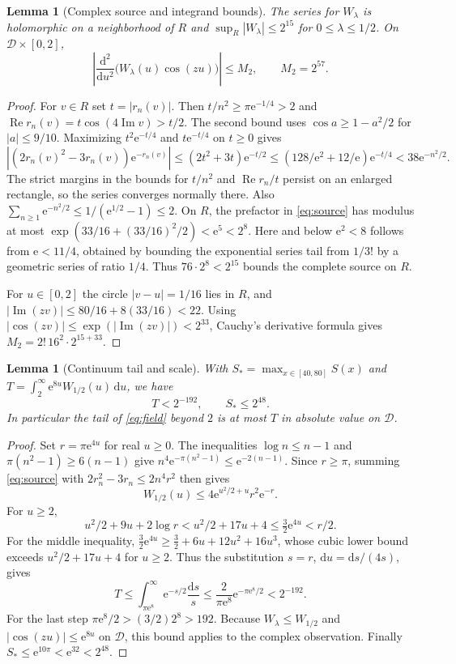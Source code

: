 \documentclass[11pt]{article}
\newtheorem{lemma}[theorem]{Lemma}
\newcommand{\e}{\mathrm e}
\newcommand{\dd}{\mathrm d}
\newcommand{\boxD}{\mathcal D}
\begin{document}
\begin{lemma}[Complex source and integrand bounds]
\label{lem:complex}
The series for \(W_\lambda\) is holomorphic on a neighborhood of \(R\)
and \(\sup_R |W_\lambda|\le 2^{15}\) for \(0\le\lambda\le1/2\). On
\(\boxD\times[0,2]\),
\[
 \left|\frac{\dd^2}{\dd u^2}\bigl(W_\lambda(u)\cos(zu)\bigr)\right|
 \le M_2,\qquad M_2=2^{57}.
\]
\end{lemma}
\begin{proof}
For \(v\in R\) set \(t=|r_n(v)|\). Then
\(t/n^2\ge\pi\e^{-1/4}>2\) and
\(\operatorname{Re}r_n(v)=t\cos(4\operatorname{Im}v)>t/2\).
The second bound uses \(\cos a\ge1-a^2/2\) for \(|a|\le9/10\).
Maximizing \(t^2\e^{-t/4}\) and \(t\e^{-t/4}\) on \(t\ge0\) gives
\[
 |(2r_n(v)^2-3r_n(v))\e^{-r_n(v)}|
 \le (2t^2+3t)\e^{-t/2}
 \le (128/\e^2+12/\e)\e^{-t/4}<38\e^{-n^2/2}.
\]
The strict margins in the bounds for \(t/n^2\) and
\(\operatorname{Re}r_n/t\) persist on an enlarged rectangle,
so the series converges normally there. Also
\(\sum_{n\ge1}\e^{-n^2/2}\le 1/(\e^{1/2}-1)\le2\).
On \(R\), the prefactor in \eqref{eq:source} has
modulus at most \(\exp(33/16+(33/16)^2/2)<\e^5<2^8\).
Here and below \(\e^2<8\) follows from \(\e<11/4\), obtained by
bounding the exponential series tail from \(1/3!\) by a geometric series
of ratio \(1/4\). Thus \(76\cdot2^8<2^{15}\) bounds the complete
source on \(R\).

For \(u\in[0,2]\) the circle \(|v-u|=1/16\) lies in \(R\), and
\(|\operatorname{Im}(zv)|\le80/16+8(33/16)<22\).
Using \(|\cos(zv)|\le \exp(|\operatorname{Im}(zv)|)<2^{33}\),
Cauchy's derivative formula gives \(M_2=2!\,16^2\cdot2^{15+33}\).
\end{proof}

\begin{lemma}[Continuum tail and scale]
\label{lem:tail}
With \(S_*=\max_{x\in[40,80]}S(x)\) and
\(T=\int_2^\infty \e^{8u}W_{1/2}(u)\,\dd u\), we have
\[
 T<2^{-192},\qquad S_*\le2^{48}.
\]
In particular the tail of \eqref{eq:field} beyond \(2\) is at most \(T\)
in absolute value on \(\boxD\).
\end{lemma}
\begin{proof}
Set \(r=\pi\e^{4u}\) for real \(u\ge0\). The inequalities
\(\log n\le n-1\) and \(\pi(n^2-1)\ge6(n-1)\) give
\(n^4\e^{-\pi(n^2-1)}\le \e^{-2(n-1)}\).
Since \(r\ge\pi\), summing \eqref{eq:source} with
\(2r_n^2-3r_n\le2n^4r^2\) then gives
\[
 W_{1/2}(u)\le4\e^{u^2/2+u}r^2\e^{-r}.
\]
For \(u\ge2\),
\[
 u^2/2+9u+2\log r
 <u^2/2+17u+4
 \le \tfrac32\e^{4u}<r/2.
\]
For the middle inequality,
\(\tfrac32\e^{4u}\ge\tfrac32+6u+12u^2+16u^3\), whose cubic
lower bound exceeds \(u^2/2+17u+4\) for \(u\ge2\).
Thus the substitution \(s=r\), \(\dd u=\dd s/(4s)\), gives
\[
 T\le\int_{\pi\e^8}^{\infty}\e^{-s/2}\frac{\dd s}{s}
 \le\frac{2}{\pi\e^8}\e^{-\pi\e^8/2}<2^{-192}.
\]
For the last step \(\pi\e^8/2>(3/2)2^8>192\).
Because \(W_\lambda\le W_{1/2}\) and
\(|\cos(zu)|\le\e^{8u}\) on \(\boxD\), this bound applies to the
complex observation. Finally \(S_*\le\e^{10\pi}<\e^{32}<2^{48}\).
\end{proof}
\end{document}

